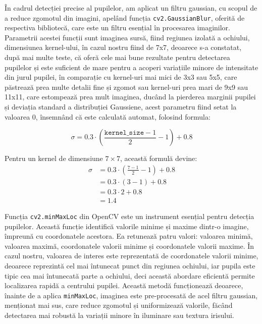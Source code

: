 \documentclass[12pt,a4paper]{article}
\begin{document}
În cadrul detecției precise al pupilelor, am aplicat un filtru gaussian,
cu scopul de a reduce zgomotul din imagini, apelând funcția
\texttt{cv2.GaussianBlur}, oferită de respectiva bibliotecă, care este un filtru
esențial în procesarea imaginilor. Parametrii acestei funcții sunt
imaginea sursă, fiind regiunea izolată a ochiului, dimensiunea
kernel-ului, în cazul nostru fiind de 7x7, deoarece s-a constatat, după
mai multe teste, că oferă cele mai bune rezultate pentru detectarea
pupilelor și este suficient de mare pentru a acoperi variațiile minore
de intensitate din jurul pupilei, în comparație cu kernel-uri mai mici
de 3x3 sau 5x5, care păstrează prea multe detalii fine și zgomot sau
kernel-uri prea mari de 9x9 sau 11x11, care estompează prea mult
imaginea, ducând la pierderea marginii pupilei și deviația standard a
distribuției Gaussiene, acest parametru fiind setat la valoarea 0,
însemnând că este calculată automat, folosind formula:

\begin{equation}
\sigma = 0.3 \cdot \left( \frac{\texttt{kernel\_size} - 1}{2} - 1 \right) + 0.8
\end{equation}

Pentru un kernel de dimensiune \(7 \times 7\), această formulă devine:
\begin{align}
\sigma &= 0.3 \cdot \left( \frac{7 - 1}{2} - 1 \right) + 0.8 \nonumber \\
    &= 0.3 \cdot (3 - 1) + 0.8 \nonumber \\
    &= 0.3 \cdot 2 + 0.8 \nonumber \\
    &= 1.4
\end{align}

Funcția \texttt{cv2.minMaxLoc} din OpenCV este un instrument esențial pentru
detecția pupilelor. Această funcție identifică valorile minime și maxime
dintr-o imagine, împreună cu coordonatele acestora. Ea retunează patru
valori: valoarea minimă, valoarea maximă, coordonatele valorii minime și
coordonatele valorii maxime. În cazul nostru, valoarea de interes este
reprezentată de coordonatele valorii minime, deoarece reprezintă cel mai
întunecat punct din regiunea ochiului, iar pupila este tipic cea mai
întunecată parte a ochiului, deci această abordare eficientă permite
localizarea rapidă a centrului pupilei. Această metodă funcționează
deoarece, înainte de a aplica \texttt{minMaxLoc}, imaginea este pre-procesată de
acel filtru gaussian, menționat mai sus, care reduce zgomotul și
uniformizează valorile, făcând detectarea mai robustă la variații minore
în iluminare sau textura irisului.
\end{document}
